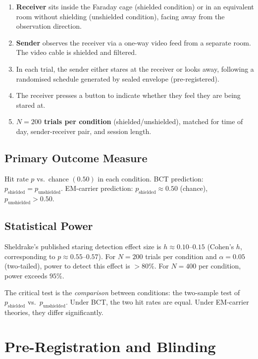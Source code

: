 \documentclass[aps,prl,twocolumn,superscriptaddress,floatfix]{revtex4-2}
\begin{document}
\begin{enumerate}
\item \textbf{Receiver} sits inside the Faraday cage (shielded
    condition) or in an equivalent room without shielding (unshielded
    condition), facing away from the observation direction.
\item \textbf{Sender} observes the receiver via a one-way video feed
    from a separate room. The video cable is shielded and filtered.
\item In each trial, the sender either stares at the receiver
    or looks away, following a randomised schedule generated by
    sealed envelope (pre-registered).
\item The receiver presses a button to indicate whether they feel
    they are being stared at.
\item \textbf{$N = 200$ trials per condition} (shielded/unshielded),
    matched for time of day, sender-receiver pair, and session length.
\end{enumerate}

\subsection{Primary Outcome Measure}

Hit rate $p$ vs.\ chance $(0.50)$ in each condition.
BCT prediction: $p_\mathrm{shielded} = p_\mathrm{unshielded}$.
EM-carrier prediction: $p_\mathrm{shielded} \approx 0.50$
(chance), $p_\mathrm{unshielded} > 0.50$.

\subsection{Statistical Power}

Sheldrake's published staring detection effect size is
$h \approx 0.10$--$0.15$ (Cohen's $h$, corresponding to
$p \approx 0.55$--$0.57$). For $N = 200$ trials per condition
and $\alpha = 0.05$ (two-tailed), power to detect this effect
is $> 80\%$. For $N = 400$ per condition, power exceeds $95\%$.

The critical test is the \emph{comparison} between conditions:
the two-sample test of $p_\mathrm{shielded}$ vs.\
$p_\mathrm{unshielded}$. Under BCT, the two hit rates are equal.
Under EM-carrier theories, they differ significantly.

\section{Pre-Registration and Blinding}
\end{document}
